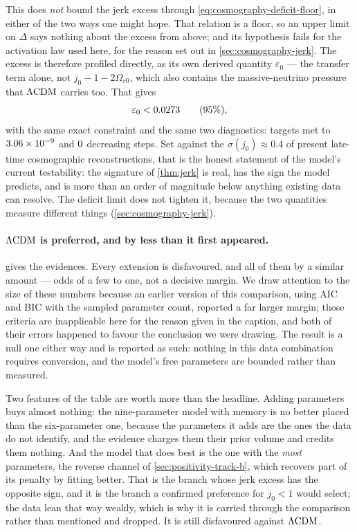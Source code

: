 This does \emph{not} bound the jerk excess through
\cref{eq:cosmography-deficit-floor}, in either of the two ways one might hope.
That relation is a floor, so an upper limit on $\Delta$ says nothing about the
excess from above; and its hypothesis fails for the activation law used here,
for the reason set out in \cref{sec:cosmography-jerk}. The excess is therefore
profiled directly, as its own derived quantity $\varepsilon_0$ --- the transfer
term alone, not $j_0-1-2\Omega_{r0}$, which also contains the massive-neutrino
pressure that $\Lambda\mathrm{CDM}$ carries too. That gives
\begin{equation}\label{eq:observations-jerk-limit}
  \varepsilon_0 < 0.0273 \qquad (95\%),
\end{equation}
with the same exact constraint and the same two diagnostics: targets met to
$\num{3.06e-09}$ and
$0$ decreasing steps. Set
against the $\sigma(j_0)\approx0.4$ of present late-time cosmographic
reconstructions, that is the honest statement of the model's current
testability: the signature of \cref{thm:jerk} is real, has the sign the model
predicts, and is more than an order of magnitude below anything existing data
can resolve. The deficit limit does not tighten it, because the two quantities
measure different things (\cref{sec:cosmography-jerk}).

\paragraph{$\Lambda\mathrm{CDM}$ is preferred, and by less than it first appeared.}
 gives the evidences. Every extension is disfavoured, and
all of them by a similar amount --- odds of a few to one, not a decisive
margin. We draw attention to the size of these numbers because an earlier
version of this comparison, using AIC and BIC with the sampled parameter count,
reported a far larger margin; those criteria are inapplicable here for the
reason given in the caption, and both of their errors happened to favour the
conclusion we were drawing. The result is a null one either way and is reported
as such: nothing in this data combination requires conversion, and the model's
free parameters are bounded rather than measured.

Two features of the table are worth more than the headline. Adding parameters
buys almost nothing: the nine-parameter model with memory is no better placed
than the six-parameter one, because the parameters it adds are the ones the
data do not identify, and the evidence charges them their prior volume and
credits them nothing. And the model that does best is the one with the
\emph{most} parameters, the reverse channel of
\cref{sec:positivity-track-b}, which recovers part of its penalty by fitting
better. That is the branch whose jerk excess has the opposite sign, and it is
the branch a confirmed preference for $j_0<1$ would select; the data lean that
way weakly, which is why it is carried through the comparison rather than
mentioned and dropped. It is still disfavoured against $\Lambda\mathrm{CDM}$.

